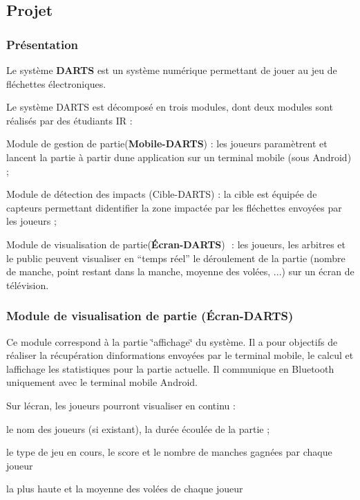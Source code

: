 \hypertarget{page__r_e_a_d_m_e_projet}{}\subsection{Projet}\label{page__r_e_a_d_m_e_projet}
\hypertarget{page__r_e_a_d_m_e_presentation}{}\subsubsection{Présentation}\label{page__r_e_a_d_m_e_presentation}
Le système {\bfseries D\+A\+R\+TS} est un système numérique permettant de jouer au jeu de fléchettes électroniques.

Le système D\+A\+R\+TS est décomposé en trois modules, dont deux modules sont réalisés par des étudiants IR \+:


\begin{DoxyItemize}
\item Module de gestion de partie​ ({\bfseries Mobile-\/\+D\+A\+R\+TS})​ \+: les joueurs paramètrent et lancent la partie à partir d\textquotesingle{}une application sur un terminal mobile (sous Android) ;
\item Module de détection des impacts​ (Cible-\/\+D\+A\+R\+TS)​ \+: la cible est équipée de capteurs permettant d\textquotesingle{}identifier la zone impactée par les fléchettes envoyées par les joueurs ;
\item Module de visualisation de partie​ ({\bfseries Écran-\/\+D\+A\+R\+TS}) ​ \+: les joueurs, les arbitres et le public peuvent visualiser en “temps réel” le déroulement de la partie (nombre de manche, point restant dans la manche, moyenne des volées, ...) sur un écran de télévision.
\end{DoxyItemize}\hypertarget{page__r_e_a_d_m_e_ecran}{}\subsubsection{Module de visualisation de partie (Écran-\/\+D\+A\+R\+T\+S)}\label{page__r_e_a_d_m_e_ecran}
Ce module correspond à la partie \char`\"{}affichage\char`\"{} du système. Il a pour objectifs de réaliser la récupération d\textquotesingle{}informations​ envoyées par le terminal mobile, ​le calcul et l\textquotesingle{}affichage les statistiques pour la partie actuelle. Il communique en Bluetooth uniquement avec le terminal mobile Android.

Sur l\textquotesingle{}écran, les joueurs pourront visualiser en continu \+:


\begin{DoxyItemize}
\item le nom des joueurs (si existant), la durée écoulée de la partie ;
\item le type de jeu en cours, le score et le nombre de manches gagnées par chaque joueur
\item la plus haute et la moyenne des volées de chaque joueur
\end{DoxyItemize}

